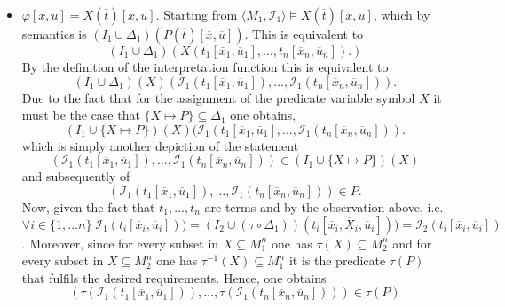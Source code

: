 \documentclass[11pt,a4paper]{article}
\begin{document}
\begin{itemize}[leftmargin=*]
\item $\varphi[\overline{x}, \overline{u}]= X(\overline{t})[\overline{x}, \overline{u}]$. Starting from $\langle M_1, \mathcal{I}_1 \rangle \models X(\overline{t})[\overline{x}, \overline{u}] $, which by semantics is $(I_1 \cup \Delta_1)(P(\overline{t})[\overline{x}, \overline{u}])$. This is equivalent to 
\begin{equation*}
(I_1 \cup \Delta_1)(X(t_1[\overline{x}_1, \overline{u}_1], \dots , t_n[\overline{x}_n, \overline{u}_n]).)
\end{equation*}
By the definition of the interpretation function this is equivalent to 
\begin{equation*}
(I_1 \cup \Delta_1)(X)(\mathcal{I}_1(t_1[\overline{x}_1, \overline{u}_1]), \dots , \mathcal{I}_1(t_n[\overline{x}_n, \overline{u}_n])).
\end{equation*}
Due to the fact that for the assignment of the predicate variable symbol $X$ it must be the case that $\{X \mapsto P\} \subseteq \Delta_1$ one obtains,
\begin{equation*}
(I_1 \cup \{X \mapsto P\})(X)(\mathcal{I}_1(t_1[\overline{x}_1, \overline{u}_1], \dots , \mathcal{I}_1(t_n[\overline{x}_n, \overline{u}_n])).
\end{equation*}
which is simply another depiction of the statement
\begin{equation*}
(\mathcal{I}_1(t_1[\overline{x}_1, \overline{u}_1]), \dots , \mathcal{I}_1(t_n[\overline{x}_n, \overline{u}_n])) \in (I_1 \cup \{X \mapsto P\})(X)
\end{equation*}
and subsequently of
\begin{equation*}
(\mathcal{I}_1(t_1[\overline{x}_1, \overline{u}_1]), \dots , \mathcal{I}_1(t_n[\overline{x}_n, \overline{u}_n])) \in P.
\end{equation*}
Now, given the fact that $t_1, \dots , t_n$ are terms and by the observation above, i.e. $\forall i \in \{1,\dots n\}\; \mathcal{I}_1(t_i[\overline{x}_i, \overline{u}_i])) = (I_2 \cup (\tau \circ \Delta_1))(t_i[\overline{x}_i, \overline{X}_i, \overline{u}_i])) = \mathcal{I}_2(t_i[\overline{x}_i,  \overline{u}_i])$. Moreover, since for every subset in $X \subseteq M_1^n$ one has $\tau(X) \subseteq M_2^n$ and for every subset in $X \subseteq M_2^n$ one has $\tau^{-1}(X) \subseteq M_1^n$ it is the predicate $\tau(P)$ that fulfils the desired requirements. Hence, one obtains
\begin{equation*}
(\tau(\mathcal{I}_1(t_1[\overline{x}_1,  \overline{u}_1])), \dots , \tau(\mathcal{I}_1(t_n[\overline{x}_n,\overline{u}_n]))) \in \tau(P)

\end{equation*}
\end{itemize}
\end{document}
